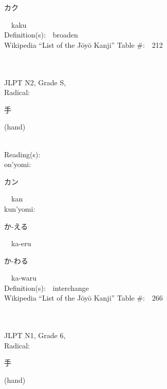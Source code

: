 \begin{multicols}{2}
{\hspace*{2em}}{\begin{CJK}{UTF8}{min} カク \end{CJK}}\ \ kaku\ \ \\
Definition(s):\ \ broaden \\
Wikipedia ``List of the J\=oy\=o Kanji'' Table \#:\ \ 212 \\
\ \ \\
{\fontsize{34pt}{40pt}  }\ \ \\  %
{JLPT N2, Grade S, \\Radical:\ \ {\begin{CJK}{UTF8}{min} 手 \end{CJK}} (hand) } \\
Reading(s):\ \ \\
{\hspace*{1em}}on'yomi:\ \ \\
{\hspace*{2em}}{\begin{CJK}{UTF8}{min} カン \end{CJK}}\ \ kan\ \ \\
{\hspace*{1em}}kun'yomi:\ \ \\
{\hspace*{2em}}{\begin{CJK}{UTF8}{min} か-える \end{CJK}}\ \ ka-eru\ \ \\
{\hspace*{2em}}{\begin{CJK}{UTF8}{min} か-わる \end{CJK}}\ \ ka-waru\ \ \\
Definition(s):\ \ interchange \\
Wikipedia ``List of the J\=oy\=o Kanji'' Table \#:\ \ 266 \\
\ \ \\
{\fontsize{34pt}{40pt}  }\ \ \\  %
{JLPT N1, Grade 6, \\Radical:\ \ {\begin{CJK}{UTF8}{min} 手 \end{CJK}} (hand) } \\

\end{multicols}

